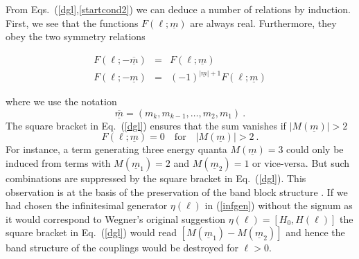 From Eqs.~(\ref{dgl},\ref{startcond2}) we can deduce a number
of relations by induction. First, we see that the functions
$F(\ell;\underline{m})$ are always real. Furthermore,
they obey the two symmetry relations
\begin{mathletters}
\label{symrel}
\begin{eqnarray}
F(\ell;-\underline{\overline{m}}) &=& F(\ell;\underline{m})\\[2mm]
F(\ell;-\underline{m}) &=& (-1)^{|\underline{m}|+1}F(\ell;\underline{m})
\end{eqnarray}
\end{mathletters}
where we use the notation 
\begin{equation}
\underline{\overline{m}} = (m_k,m_{k-1},\ldots,m_2,m_1)\ .
\end{equation}
The square bracket in Eq.~(\ref{dgl}) ensures that the sum vanishes
if $|M(\underline{m})|>2$
\begin{equation}
F(\ell;\underline{m}) = 0 \quad \mbox{for}\quad |M(\underline{m})|>2 \ .
\end{equation}
 For instance, a term generating three energy
quanta $M(\underline{m})=3$ could only be induced
from terms with $M(\underline{m}_1)=2$ and $M(\underline{m}_2)=1$
or vice-versa. But such combinations are suppressed by the square
bracket in Eq.~(\ref{dgl}). 
This observation is at the basis of the preservation of
the band block structure \cite{mielk98}. If we had chosen the
infinitesimal generator $\eta(\ell)$ in (\ref{infgen}) without the
signum as it would correspond to Wegner's original suggestion
$\eta(\ell) =[H_0,H(\ell)]$ the square bracket in Eq.~(\ref{dgl}) 
would read $[M(\underline{m}_1)-M(\underline{m}_2)]$ and hence the 
band structure of the couplings would be destroyed for $\ell>0$.

